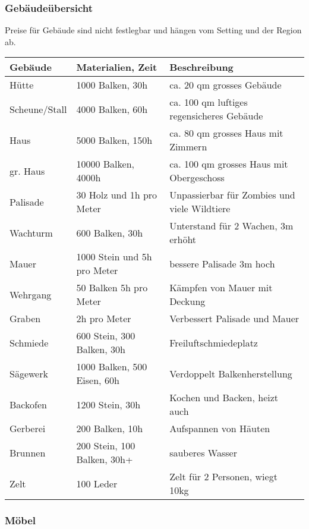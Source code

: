 \documentclass{article}
\begin{document}
\subsubsection{Gebäudeübersicht}

Preise für Gebäude sind nicht festlegbar und hängen vom Setting und der Region ab.


\begin{small}
\begin{tabular}{|m{3cm}|m{4cm}|m{6cm}|}
\hline
\textbf{Gebäude}&\textbf{Materialien, Zeit}&\textbf{Beschreibung}\\
\hline
\hline
Hütte&1000 Balken, 30h&ca. 20 qm grosses Gebäude\\
\hline
Scheune/Stall&4000 Balken, 60h&ca. 100 qm luftiges regensicheres Gebäude\\
\hline
Haus&5000 Balken, 150h&ca. 80 qm grosses Haus mit Zimmern\\
\hline
gr. Haus&10000 Balken, 4000h&ca. 100 qm grosses Haus mit Obergeschoss\\
\hline
Palisade&30 Holz und 1h pro Meter&Unpassierbar für Zombies und viele Wildtiere\\
\hline
Wachturm&600 Balken, 30h&Unterstand für 2 Wachen, 3m erhöht\\
\hline
Mauer&1000 Stein und 5h pro Meter&bessere Palisade 3m hoch\\
\hline
Wehrgang&50 Balken 5h pro Meter&Kämpfen von Mauer mit Deckung\\
\hline
Graben&2h pro Meter&Verbessert Palisade und Mauer\\
\hline
Schmiede&600 Stein, 300 Balken, 30h&Freiluftschmiedeplatz\\
\hline
Sägewerk&1000 Balken, 500 Eisen, 60h&Verdoppelt Balkenherstellung\\
\hline
Backofen&1200 Stein, 30h&Kochen und Backen, heizt auch\\
\hline
Gerberei&200 Balken, 10h&Aufspannen von Häuten\\
\hline
Brunnen&200 Stein, 100 Balken, 30h+&sauberes Wasser\\
\hline
Zelt&100 Leder&Zelt für 2 Personen, wiegt 10kg\\
\hline
\end{tabular}
\end{small}

\subsubsection{Möbel}
\end{document}

